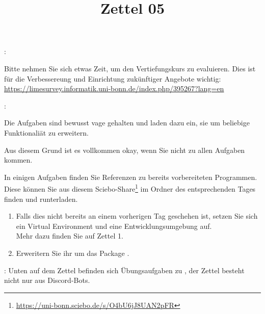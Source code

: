 \documentclass{config/minimal_uebungszettel}
\title{Zettel 05}
\theoremstyle{definition}
\newcommand{\pp}[1]{\lpl{#1}}
\newcommand{\furl}[1]{\footnote{\url{#1}}}
\begin{document}
	\maketitle


    \noindent {}: \quad
	
	\noindent Bitte nehmen Sie sich etwas Zeit, um den Vertiefungskurs zu evaluieren. Dies ist für die Verbessereung und Einrichtung zukünftiger Angebote wichtig:\\
    \underline{\url{https://limesurvey.informatik.uni-bonn.de/index.php/395267?lang=en}}

	\medskip
    \medskip
	
	\noindent {}: \quad
	
	\noindent Die Aufgaben sind bewusst vage gehalten und laden dazu ein, sie um beliebige Funktionaliät zu erweitern.
	
	\noindent Aus diesem Grund ist es vollkommen okay, wenn Sie nicht zu allen Aufgaben kommen.
	
	\noindent In einigen Aufgaben finden Sie Referenzen zu bereits vorbereiteten Programmen. Diese können Sie aus diesem Sciebo-Share\furl{https://uni-bonn.sciebo.de/s/O4bU6jJ8UAN2pFR} im Ordner des entsprechenden Tages finden und runterladen.
	
	\medskip
	
	
	\noindent {} \quad
	
    \begin{enumerate}
	\item Falls dies nicht bereits an einem vorherigen Tag geschehen ist, setzen Sie sich ein Virtual Environment und eine Entwicklungsumgebung auf.\\
	Mehr dazu finden Sie auf Zettel 1.
	
	\item Erweritern Sie ihr \pp{venv} um das Package \pp{discord.py}.
\end{enumerate}

\medskip


\noindent {}: Unten auf dem Zettel befinden sich Übungsaufgaben zu , der Zettel besteht nicht nur aus Discord-Bots.
	
	\medskip
	
\end{document}
